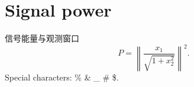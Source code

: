 \documentclass{article}
\newcommand{\norm}[1]{\left\lVert #1 \right\rVert}
\begin{document}
  \section{Signal power}
  {\han 信号能量与观测窗口}
  \begin{equation}
    P = \norm{\frac{x_{1}}{\sqrt{1+x_{2}^{2}}}}^{2}.
  \end{equation}
  Special characters: \% \& \_ \# \$.
\end{document}
